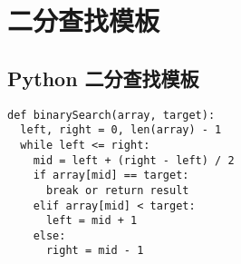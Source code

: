 \newpage
\section{二分查找模板}

\subsection{Python 二分查找模板}

\begin{verbatim}
def binarySearch(array, target):
  left, right = 0, len(array) - 1
  while left <= right:
    mid = left + (right - left) / 2
    if array[mid] == target:
      break or return result
    elif array[mid] < target:
      left = mid + 1
    else:
      right = mid - 1
\end{verbatim}